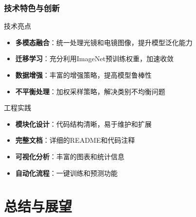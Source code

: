 \documentclass[10pt]{beamer}
\begin{document}
\begin{frame}
\frametitle{技术特色与创新}
\begin{block}{技术亮点}
\begin{itemize}
    \item \textbf{多模态融合}：统一处理光镜和电镜图像，提升模型泛化能力
    \item \textbf{迁移学习}：充分利用ImageNet预训练权重，加速收敛
    \item \textbf{数据增强}：丰富的增强策略，提高模型鲁棒性
    \item \textbf{不平衡处理}：加权采样策略，解决类别不均衡问题
\end{itemize}
\end{block}

\begin{block}{工程实践}
\begin{itemize}
    \item \textbf{模块化设计}：代码结构清晰，易于维护和扩展
    \item \textbf{完整文档}：详细的README和代码注释
    \item \textbf{可视化分析}：丰富的图表和统计信息
    \item \textbf{自动化流程}：一键训练和预测功能
\end{itemize}
\end{block}
\end{frame}

\section{总结与展望}
\end{document}
